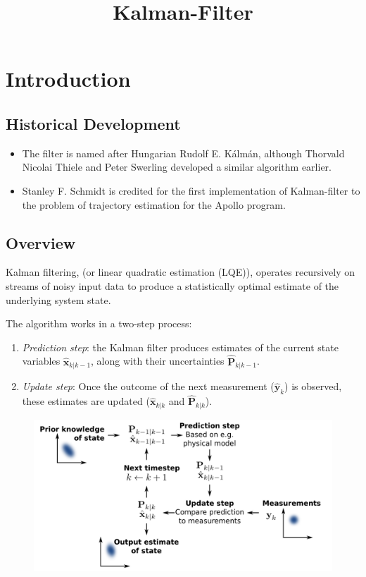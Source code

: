 \documentclass[twocolumn]{article}
\title{Kalman-Filter}
\date{\vspace{-6ex}}
\numberwithin{equation}{section}
\begin{document}
\maketitle


\section{Introduction}
	\subsection{Historical Development}
\begin{itemize}
	\item The filter is named after Hungarian Rudolf E. Kálmán, although Thorvald Nicolai Thiele and Peter Swerling developed a similar algorithm earlier. 
	\item Stanley F. Schmidt is credited for the first implementation of Kalman-filter to the problem of trajectory estimation for the Apollo program.
\end{itemize}
	
	\subsection{Overview}
Kalman filtering, (or linear quadratic estimation (LQE)), operates recursively on streams of noisy input data to produce a statistically optimal estimate of the underlying system state.

The algorithm works in a two-step process:
\begin{enumerate}
	\item \emph{Prediction step}: the Kalman filter produces estimates of the current state variables $\hat{\mathbf{x}}_{k|k-1}$, along with their uncertainties $\hat{\mathbf{P}}_{k|k-1}$.
	\item \emph{Update step}: Once the outcome of the next measurement ($\hat{\mathbf{y}}_k$) is observed, these estimates are updated ($\hat{\mathbf{x}}_{k|k}$ and $\hat{\mathbf{P}}_{k|k}$).
\end{enumerate}

\begin{figure}[H]
    \centering
    \includegraphics[width=.49\textwidth]{Basic_concept_of_Kalman_filtering.png}
\end{figure}
\end{document}

